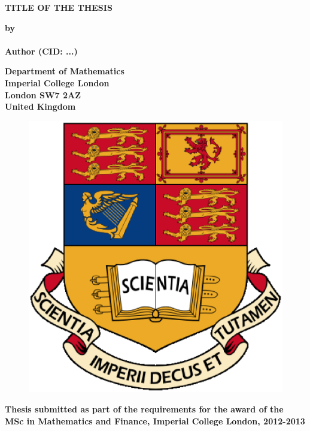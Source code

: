\thispagestyle{empty}
\null\vskip0.2in%
\begin{center}
\LARGE{{\bf 
TITLE OF THE THESIS}}
\end{center}

\vspace{0.5cm}

\begin{center}
{\Large {\bf by}}\\
\mbox{} \\
{\Large {\bf Author (CID: ...)}}
\end{center}

\vspace{1cm}

\begin{center}
\large{\bf{Department of Mathematics \\ Imperial College London \\
London SW7 2AZ \\ United Kingdom}}
\end{center}


\vspace{1.5cm}

\begin{figure}[!h]
\centering
\includegraphics[scale=0.4]{IC_Crest.eps}
\end{figure}

\vspace{1.5cm}

\begin{center}
\large{\bf{Thesis submitted as part of the requirements for the award of the \\
MSc in Mathematics and Finance, Imperial College London, 2012-2013}}
\end{center}

\vspace{2cm}

